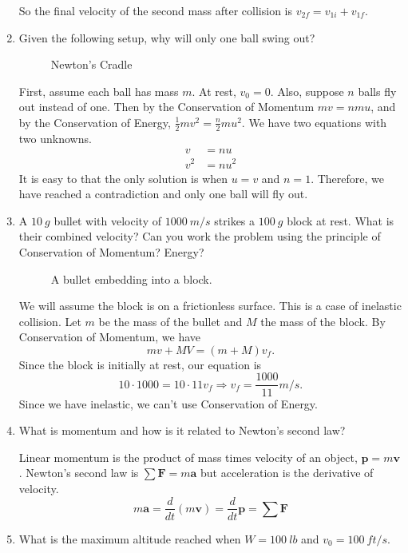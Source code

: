 \begin{enumerate}
\[  \]
  So the final velocity of the second mass after collision is
  \(v_{2f} = v_{1i} + v_{1f}\).
\item
  Given the following setup, why will only one ball swing out?
  \begin{figure}[H]
    \centering
    
    \caption{Newton's Cradle}
  \end{figure}
  First, assume each ball has mass \(m\).
  At rest, \(v_0 = 0\).
  Also, suppose \(n\) balls fly out instead of one.
  Then by the Conservation of Momentum \(mv = nmu\), and by the Conservation of
  Energy, \(\frac{1}{2}mv^2 = \frac{n}{2}mu^2\).
  We have two equations with two unknowns.
  \begin{align*}
    v &= nu\\
    v^2 &= nu^2
  \end{align*}
  It is easy to that the only solution is when \(u = v\) and \(n = 1\).
  Therefore, we have reached a contradiction and only one ball will fly out.
\item
  A \(10 \ g\) bullet with velocity of \(1000 \ m/s\) strikes a \(100 \ g\)
  block at rest.
  What is their combined velocity?
  Can you work the problem using the principle of Conservation of Momentum?
  Energy?
  \begin{figure}[H]
    \centering
    
    \caption{A bullet embedding into a block.}
  \end{figure}
  We will assume the block is on a frictionless surface.
  This is a case of inelastic collision.
  Let \(m\) be the mass of the bullet and \(M\) the mass of the block.
  By Conservation of Momentum, we have
  \[
  mv + MV = (m + M)v_f.
  \]
  Since the block is initially at rest, our equation is
  \[
  10\cdot 1000 = 10\cdot 11v_f\Rightarrow v_f = \frac{1000}{11}m/s.
  \]
  Since we have inelastic, we can't use Conservation of Energy.
\item
  What is momentum and how is it related to Newton's second law?
  \par\smallskip
  Linear momentum is the product of mass times velocity of an object,
  \(\mathbf{p} = m\mathbf{v}\).
  Newton's second law is \(\sum\mathbf{F} = m\mathbf{a}\) but acceleration
  is the derivative of velocity.
  \[
  m\mathbf{a} = \frac{d}{dt}(m\mathbf{v}) = \frac{d}{dt}\mathbf{p} =
  \sum\mathbf{F}
  \]
\item
  What is the maximum altitude reached when \(W = 100 \ lb\) and
  \(v_0 = 100 \ ft/s\).

\end{enumerate}
